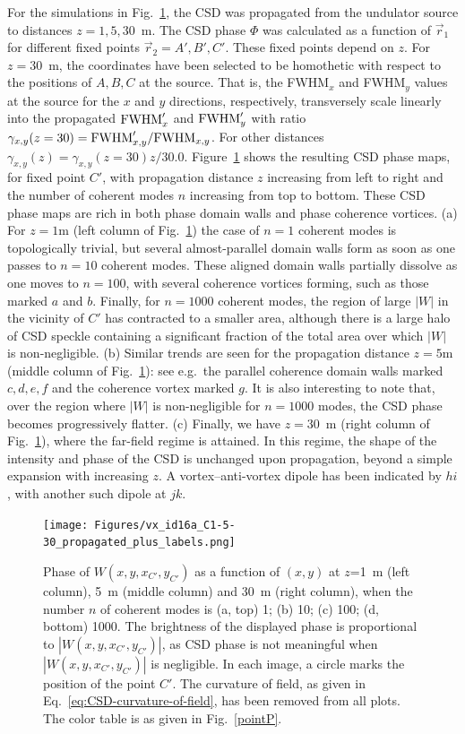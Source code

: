 \documentclass[%
 reprint,
 amsmath,amssymb,
 aps,
]{revtex4-1}
\begin{document}
For the simulations in Fig.~\ref{pointC_propagated}, the CSD was propagated from the undulator source to distances $z=1,5,30$~m. The CSD phase $\Phi$ was calculated as a function of $\vec{r}_1$ for different fixed points $\vec{r}_2=A',B',C'$. These fixed points depend on $z$. For $z=30$~m, the coordinates have been selected to be homothetic with respect to the positions of $A, B, C$ at the source. That is, the FWHM$_x$ and FWHM$_y$ values at the source for the $x$ and $y$ directions, respectively, transversely scale linearly into the propagated ${\rm FWHM}'_x$ and ${\rm FWHM}'_y$ with ratio $\gamma_{x,y}(z=30)={\rm FWHM}'_{x,y}/{\rm FWHM}_{x,y}$.
For other distances $\gamma_{x,y}(z)= \gamma_{x,y}(z=30) z / 30.0$. Figure~\ref{pointC_propagated} shows the resulting CSD phase maps, for fixed point $C'$, with propagation distance $z$ increasing from left to right and the number of coherent modes $n$ increasing from top to bottom. These CSD phase maps are rich in both phase domain walls and phase coherence vortices.  (a) For $z=1$m (left column of Fig.~\ref{pointC_propagated}) the case of $n=1$ coherent modes is topologically trivial, but several almost-parallel domain walls form as soon as one passes to $n=10$ coherent modes.  These aligned domain walls partially dissolve as one moves to $n=100$, with several coherence vortices forming, such as those marked $a$ and $b$.  Finally, for $n=1000$ coherent modes, the region of large $|W|$ in the vicinity of $C'$ has contracted to a smaller area, although there is a large halo of CSD speckle containing a significant fraction of the total area over which $|W|$ is non-negligible. (b) Similar trends are seen for the propagation distance $z=5$m (middle column of Fig.~\ref{pointC_propagated}): see e.g.~the parallel coherence domain walls marked $c,d,e,f$ and the coherence vortex marked $g$.  It is also interesting to note that, over the region where $|W|$ is non-negligible for $n=1000$ modes, the CSD phase becomes progressively flatter.  (c) Finally, we have $z=30$~m (right column of Fig.~\ref{pointC_propagated}), where the far-field regime is attained. In this regime, the shape of the intensity and phase of the CSD is unchanged upon propagation, beyond a simple expansion with increasing $z$. A  vortex--anti-vortex dipole has been indicated by $hi$, with another such dipole at $jk$. 

\begin{figure}
\texttt{[image: Figures/vx\_id16a\_C1-5-30\_propagated\_plus\_labels.png]}
\caption{Phase of $W(x,y,x_{C'},y_{C'})$ as a function of $(x,y)$ at $z$=1~m (left column), 5~m (middle column) and 30~m (right column), when the number $n$ of coherent modes is (a, top) 1; (b) 10; (c) 100; (d, bottom) 1000. The brightness of the displayed phase is proportional to $|W(x,y,x_{C'},y_{C'})|$, as CSD phase is not meaningful when $|W(x,y,x_{C'},y_{C'})|$ is negligible. In each image, a circle marks the position of the point $C'$. The curvature of field, as given in Eq.~\ref{eq:CSD-curvature-of-field}, has been removed from all plots.  The color table is as given in Fig.~\ref{pointP}.}
\label{pointC_propagated}%
\end{figure}
\end{document}

